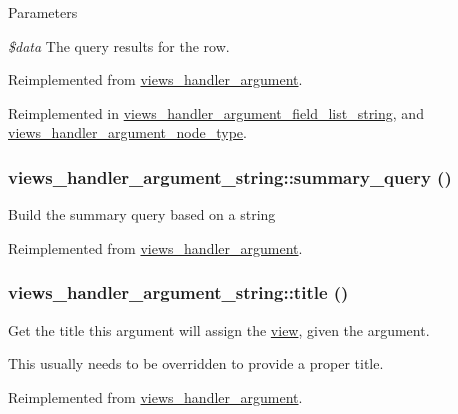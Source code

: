 \begin{DoxyParams}{Parameters}
\item[{\em \$data}]The query results for the row. \end{DoxyParams}


Reimplemented from \hyperlink{classviews__handler__argument_a4c55a340453eed4d35c69f7ac790cac1}{views\_\-handler\_\-argument}.

Reimplemented in \hyperlink{classviews__handler__argument__field__list__string_a02abc27f8dfd06bd5c6f9e24860afe9c}{views\_\-handler\_\-argument\_\-field\_\-list\_\-string}, and \hyperlink{classviews__handler__argument__node__type_ae4200f641b598c219f733f10386f7d90}{views\_\-handler\_\-argument\_\-node\_\-type}.\hypertarget{classviews__handler__argument__string_a829ad5356d65f02a75af5d1e8374292b}{
\subsubsection[{summary\_\-query}]{\setlength{\rightskip}{0pt plus 5cm}views\_\-handler\_\-argument\_\-string::summary\_\-query ()}}
\label{classviews__handler__argument__string_a829ad5356d65f02a75af5d1e8374292b}
Build the summary query based on a string 

Reimplemented from \hyperlink{classviews__handler__argument_a1dd6cc301b1c7c1c6829c59eb641a883}{views\_\-handler\_\-argument}.\hypertarget{classviews__handler__argument__string_abd176c527d765826b51c50346309b545}{
\subsubsection[{title}]{\setlength{\rightskip}{0pt plus 5cm}views\_\-handler\_\-argument\_\-string::title ()}}
\label{classviews__handler__argument__string_abd176c527d765826b51c50346309b545}
Get the title this argument will assign the \hyperlink{classview}{view}, given the argument.

This usually needs to be overridden to provide a proper title. 

Reimplemented from \hyperlink{classviews__handler__argument_a76181ac24e7be4a09aaafc1fa5f15ea1}{views\_\-handler\_\-argument}.


